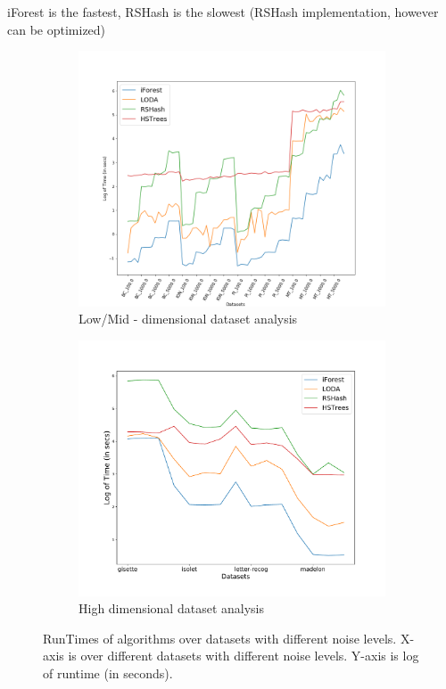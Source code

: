iForest is the fastest, RSHash is the slowest (RSHash implementation, however can be optimized)
\begin{figure}[ht!]
    \centering
    \begin{subfigure}[t]{0.48\textwidth}
        \centering
        \includegraphics[width=\linewidth]{fig/baseline/TimeAnalysis_LowDim.png}
        \caption{Low/Mid - dimensional dataset analysis}
    \end{subfigure}
    \hfill
    \begin{subfigure}[t]{0.48\textwidth}
        \centering
        \includegraphics[width=\linewidth]{fig/baseline/TimeAnalysis_HighDim.pdf}
        \caption{High dimensional dataset analysis}
    \end{subfigure}
		\hfill
    \caption{RunTimes of algorithms over datasets with different noise levels. X-axis is over different datasets with different noise levels. Y-axis is log of runtime (in seconds).}
\end{figure}

\pagebreak
